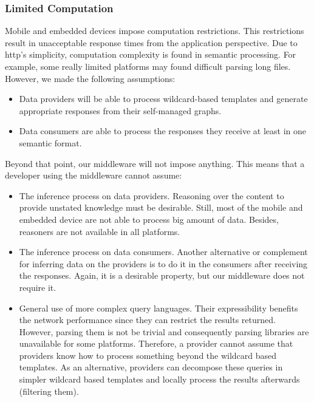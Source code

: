 \subsubsection{Limited Computation}

Mobile and embedded devices impose computation restrictions.
This restrictions result in unacceptable response times from the application perspective.
Due to \ac{http}'s simplicity, computation complexity is found in semantic processing.
For example, some really limited platforms may found difficult parsing long files.
However, we made the following assumptions:
\begin{itemize}
  \item Data providers will be able to process wildcard-based templates and generate appropriate responses from their self-managed graphs.
  \item Data consumers are able to process the responses they receive at least in one semantic format. %
\end{itemize}


Beyond that point, our middleware will not impose anything.
This means that a developer using the middleware cannot assume:
\begin{itemize}
  \item The inference process on data providers.
        Reasoning over the content to provide unstated knowledge must be desirable.
        Still, most of the mobile and embedded device are not able to process big amount of data. %
        Besides, reasoners are not available in all platforms.
  \item The inference process on data consumers.
        Another alternative or complement for inferring data on the providers is to do it in the consumers after receiving the responses.
        Again, it is a desirable property, but our middleware does not require it.
  \item General use of more complex query languages.
        Their expressibility benefits the network performance since they can restrict the results returned.
        However, parsing them is not be trivial and consequently parsing libraries are unavailable for some platforms.
        Therefore, a provider cannot assume that providers know how to process something beyond the wildcard based templates.
        As an alternative, providers can decompose these queries in simpler wildcard based templates and locally process the results afterwards (filtering them).
\end{itemize}


